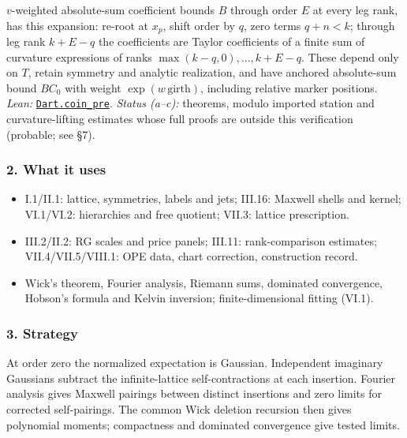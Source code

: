 \documentclass[
  letterpaper,
  11pt]{article}
\providecommand{\tightlist}{%
  \setlength{\itemsep}{0pt}\setlength{\parskip}{0pt}}
\begin{document}
\begin{enumerate}
  \(v\)-weighted absolute-sum coefficient bounds \(B\) through order
  \(E\) at every leg rank, has this expansion: re-root at \(x_p\), shift
  order by \(q\), zero terms \(q+n<k\); through leg rank \(k+E-q\) the
  coefficients are Taylor coefficients of a finite sum of curvature
  expressions of ranks \(\max(k-q,0),\ldots,k+E-q\). These depend only
  on \(T\), retain symmetry and analytic realization, and have anchored
  absolute-sum bound \(BC_0\) with weight \(\exp(w\,\mathrm{girth})\),
  including relative marker positions. \emph{Lean:}
  \href{https://github.com/yang-mills-group/OpenAI-YM-20261028/blob/3456e5e75cf8d4cd558955a5c7638fba2d68f464/YM/RG08/Dart/Seams.lean\#L34-L45}{\texttt{Dart.coin\_pre}}.
  \emph{Status (a--c):} theorems, modulo imported station and
  curvature-lifting estimates whose full proofs are outside this
  verification (probable; see §7).
\end{enumerate}

\subsubsection{2. What it uses}\label{what-it-uses-25}

\begin{itemize}
\tightlist
\item
  I.1/II.1: lattice, symmetries, labels and jets; III.16: Maxwell shells
  and kernel; VI.1/VI.2: hierarchies and free quotient; VII.3: lattice
  prescription.
\item
  III.2/II.2: RG scales and price panels; III.11: rank-comparison
  estimates; VII.4/VII.5/VIII.1: OPE data, chart correction,
  construction record.
\item
  Wick's theorem, Fourier analysis, Riemann sums, dominated convergence,
  Hobson's formula and Kelvin inversion; finite-dimensional fitting
  (VI.1).
\end{itemize}

\subsubsection{3. Strategy}\label{strategy-25}

At order zero the normalized expectation is Gaussian. Independent
imaginary Gaussians subtract the infinite-lattice self-contractions at
each insertion. Fourier analysis gives Maxwell pairings between distinct
insertions and zero limits for corrected self-pairings. The common Wick
deletion recursion then gives polynomial moments; compactness and
dominated convergence give tested limits.
\end{document}
